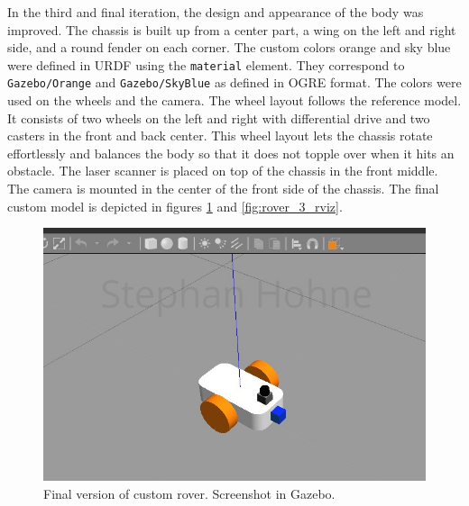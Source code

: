 \documentclass[10pt,journal,compsoc]{IEEEtran}
\begin{document}
In the third and final iteration, the design and appearance of the body was improved. The chassis is built up from a center part, a wing on the left and right side, and a round fender on each corner. The custom colors orange and sky blue were defined in URDF using the \texttt{material} element. They correspond to \texttt{Gazebo/Orange} and \texttt{Gazebo/SkyBlue} as defined in OGRE format. The colors were used on the wheels and the camera. The wheel layout follows the reference model. It consists of two wheels on the left and right with differential drive and two casters in the front and back center. This wheel layout lets the chassis rotate effortlessly and balances the body so that it does not topple over when it hits an obstacle. The laser scanner is placed on top of the chassis in the front middle. The camera is mounted in the center of the front side of the chassis. The final custom model is depicted in figures \ref{fig:rover_3_gazebo} and \ref{fig:rover_3_rviz}.
\begin{figure}[thpb]
      \centering
      \includegraphics[width=\columnwidth]{images/rover_version_3_gazebo_side.png}
      \caption{Final version of custom rover. Screenshot in Gazebo.}
      \label{fig:rover_3_gazebo}
\end{figure}
\end{document}
